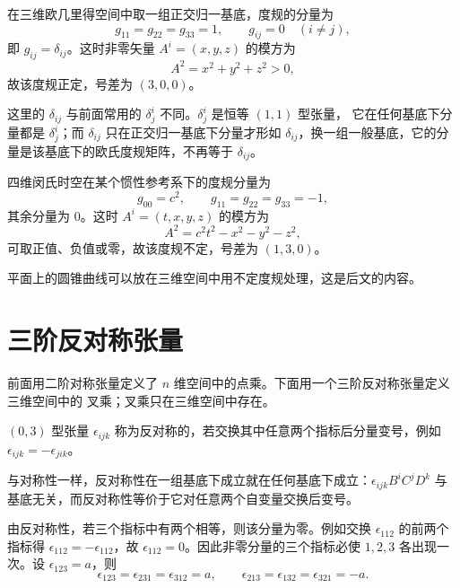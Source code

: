 \begin{example}[欧氏度规]
在三维欧几里得空间中取一组正交归一基底，度规的分量为
\[
g_{11}=g_{22}=g_{33}=1,\qquad g_{ij}=0\quad(i\ne j),
\]
即 $g_{ij}=\delta_{ij}$。这时非零矢量 $A^i=(x,y,z)$ 的模方为
\[
A^2=x^2+y^2+z^2>0 ,
\]
故该度规正定，号差为 $(3,0,0)$。
\end{example}

\begin{remark}
这里的 $\delta_{ij}$ 与前面常用的 $\delta^i_j$ 不同。$\delta^i_j$ 是恒等 $(1,1)$ 型张量，
它在任何基底下分量都是 $\delta^i_j$；而 $\delta_{ij}$ 只在正交归一基底下分量才形如
$\delta_{ij}$，换一组一般基底，它的分量是该基底下的欧氏度规矩阵，不再等于 $\delta_{ij}$。
\end{remark}

\begin{example}[闵氏度规]
四维闵氏时空在某个惯性参考系下的度规分量为
\[
g_{00}=c^2,\qquad g_{11}=g_{22}=g_{33}=-1,
\]
其余分量为 $0$。这时 $A^i=(t,x,y,z)$ 的模方为
\[
A^2=c^2t^2-x^2-y^2-z^2 ,
\]
可取正值、负值或零，故该度规不定，号差为 $(1,3,0)$。
\end{example}

\begin{example}
平面上的圆锥曲线可以放在三维空间中用不定度规处理，这是后文的内容。
\end{example}

\section{三阶反对称张量}

前面用二阶对称张量定义了 $n$ 维空间中的点乘。下面用一个三阶反对称张量定义三维空间中的
叉乘；叉乘只在三维空间中存在。

\begin{definition}[反对称张量]
$(0,3)$ 型张量 $\epsilon_{ijk}$ 称为反对称的，若交换其中任意两个指标后分量变号，例如
$\epsilon_{ijk}=-\epsilon_{jik}$。
\end{definition}

与对称性一样，反对称性在一组基底下成立就在任何基底下成立：$\epsilon_{ijk}B^iC^jD^k$ 与
基底无关，而反对称性等价于它对任意两个自变量交换后变号。

由反对称性，若三个指标中有两个相等，则该分量为零。例如交换 $\epsilon_{112}$ 的前两个指标得
$\epsilon_{112}=-\epsilon_{112}$，故 $\epsilon_{112}=0$。因此非零分量的三个指标必使 $1,2,3$
各出现一次。设 $\epsilon_{123}=a$，则
\[
\epsilon_{123}=\epsilon_{231}=\epsilon_{312}=a,\qquad
\epsilon_{213}=\epsilon_{132}=\epsilon_{321}=-a .
\]

